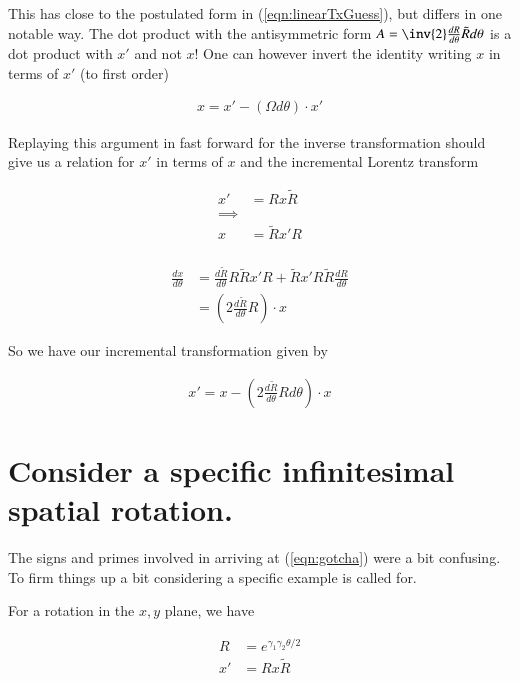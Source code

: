 \documentclass{article}
\newcommand{\boxedeqn}[1]{%
  \[\fbox{%
      \addtolength{\linewidth}{-2\fboxsep}%
      \addtolength{\linewidth}{-2\fboxrule}%
      \begin{minipage}{\linewidth}%
      \begin{equation}#1\end{equation}%
      \end{minipage}%
    }\]%
}
\begin{document}
This has close to the postulated form in (\ref{eqn:linearTxGuess}), but differs in one notable way.  The dot product with the antisymmetric form $A = \inv{2} \frac{dR}{d\theta} \tilde{R} d\theta$ is a dot product with $x'$ and not $x$!  One can however 
invert the identity writing $x$ in terms of $x'$ (to first order)

\begin{align*}
x = x' - ( \Omega d\theta ) \cdot x'
\end{align*}

Replaying this argument in fast forward for the inverse transformation should give us a relation for $x'$ in terms of $x$
and the incremental Lorentz transform

\begin{align*}
x' &= R x \tilde{R} \\
\implies \\
x &= \tilde{R} x' {R} \\
\end{align*}

\begin{align*}
\frac{dx}{d\theta}
&= \frac{d \tilde{R}}{d\theta} R \tilde{R} x' R + \tilde{R} x' R \tilde{R} \frac{d {R}}{d\theta}  \\
&= \left(2 \frac{d \tilde{R}}{d\theta} R \right) \cdot x
\end{align*}

So we have our incremental transformation given by

\begin{align}\label{eqn:gotcha}
x'= x - \left(2 \frac{d \tilde{R}}{d\theta} R d\theta \right) \cdot x
\end{align}


\section{Consider a specific infinitesimal spatial rotation.}

The signs and primes involved in arriving at (\ref{eqn:gotcha}) were a bit confusing.  To firm things
up a bit considering a specific example is called for.

For a rotation in the $x,y$ plane, we have

\begin{align}
R &= e^{\gamma_1 \gamma_2 \theta/2} \\
x' &= R x \tilde{R}
\end{align}
\end{document}
